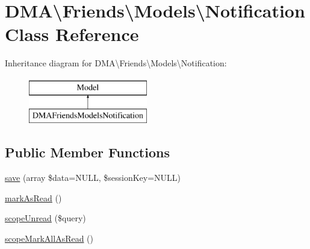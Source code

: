 \hypertarget{classDMA_1_1Friends_1_1Models_1_1Notification}{\section{D\-M\-A\textbackslash{}Friends\textbackslash{}Models\textbackslash{}Notification Class Reference}
\label{classDMA_1_1Friends_1_1Models_1_1Notification}
}
Inheritance diagram for D\-M\-A\textbackslash{}Friends\textbackslash{}Models\textbackslash{}Notification\-:\begin{figure}[H]
\begin{center}
\leavevmode
\includegraphics[height=2.000000cm]{de/d7f/classDMA_1_1Friends_1_1Models_1_1Notification}
\end{center}
\end{figure}
\subsection*{Public Member Functions}
\begin{DoxyCompactItemize}
\item 
\hyperlink{classDMA_1_1Friends_1_1Models_1_1Notification_a221608de6df08ac2cab3b145410bc012}{save} (array \$data=N\-U\-L\-L, \$session\-Key=N\-U\-L\-L)
\item 
\hyperlink{classDMA_1_1Friends_1_1Models_1_1Notification_a8618793fa0a9030d6cbfae08a3b74803}{mark\-As\-Read} ()
\item 
\hyperlink{classDMA_1_1Friends_1_1Models_1_1Notification_a92a7c07cfcd4bcb202edb6969fc8c309}{scope\-Unread} (\$query)
\item 
\hyperlink{classDMA_1_1Friends_1_1Models_1_1Notification_ab1e72f01e20cbe1027318a202938dc07}{scope\-Mark\-All\-As\-Read} ()
\end{DoxyCompactItemize}
